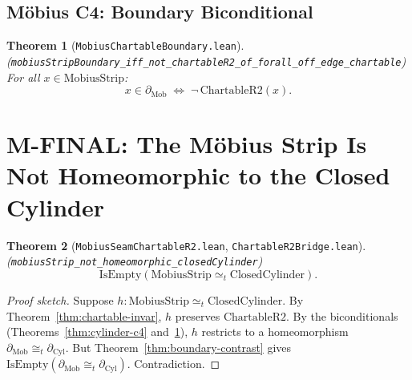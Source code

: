 \documentclass[11pt]{article}
\newtheorem{theorem}{Theorem}[section]
\newcommand{\leanref}[1]{\texttt{\small #1}}
\begin{document}
\subsection{M\"obius C4: Boundary Biconditional}

\begin{theorem}[\leanref{MobiusChartableBoundary.lean}]
\label{thm:mobius-c4}
(\leanref{mobiusStripBoundary\_iff\_not\_chartableR2\_of\_forall\_off\_edge\_chartable})
For all $x \in \mathrm{MobiusStrip}$:
\[
  x \in \partial_{\mathrm{Mob}} \;\iff\; \neg\,\mathrm{ChartableR2}(x).
\]
\end{theorem}


\section{M-FINAL: The M\"obius Strip Is Not Homeomorphic to the Closed Cylinder}
\label{sec:mfinal}


\begin{theorem}[\leanref{MobiusSeamChartableR2.lean}, \leanref{ChartableR2Bridge.lean}]
\label{thm:mfinal}
(\leanref{mobiusStrip\_not\_homeomorphic\_closedCylinder})
\[
  \mathrm{IsEmpty}\!\left(\mathrm{MobiusStrip} \simeq_t \mathrm{ClosedCylinder}\right).
\]
\end{theorem}

\begin{proof}[Proof sketch]
Suppose $h : \mathrm{MobiusStrip} \simeq_t \mathrm{ClosedCylinder}$. By Theorem~\ref{thm:chartable-invar}, $h$ preserves $\mathrm{ChartableR2}$. By the biconditionals (Theorems~\ref{thm:cylinder-c4} and~\ref{thm:mobius-c4}), $h$ restricts to a homeomorphism $\partial_{\mathrm{Mob}} \cong_t \partial_{\mathrm{Cyl}}$. But Theorem~\ref{thm:boundary-contrast} gives $\mathrm{IsEmpty}(\partial_{\mathrm{Mob}} \cong_t \partial_{\mathrm{Cyl}})$. Contradiction.
\end{proof}

\end{document}
